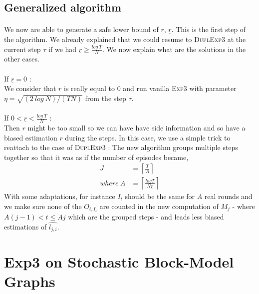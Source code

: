 \documentclass[11pt,a4paper]{article}
\begin{document}
\subsection{Generalized algorithm}
\paragraph{}We now are able to generate a safe lower bound of $r$, $\underline{r}$. This is the first step of the algorithm. We already explained that we could resume to \textsc{DuplExp3} at the current step $\tau$ if we had $ \underline{r} \geq \frac{log\ T}{N}$. We now explain what are the solutions in the other cases.\\

\paragraph{} If $\underline{r}=0$ : \\
We consider that $r$ is really equal to $0$ and run vanilla \textsc{Exp3} with parameter $\eta=\sqrt{\left(2\ log\ N \right)/\left(TN\right)}$ from the step $\tau$.

\paragraph{}If $0< \underline{r} < \frac{log\ T}{N}$ :\\
Then $r$ might be too small so we can have have side information and so have a biased estimation $r$ during the steps. In this case, we use a simple trick to reattach to the case of \textsc{DuplExp3} : The new algorithm groups multiple steps together so that it was as if the number of episodes became,
\begin{align*}
J &= \left\lceil \frac{T}{A} \right\rceil \\
where\ A & =\left\lceil \frac{log T}{N \underline{r}} \right\rceil
\end{align*}
With some adaptations, for instance $I_t$ should be the same for $A$ real rounds and we make sure none of the $O_{t,I_t}$ are counted in the new computation of $M_j$ - where $A(j-1)<t\leq Aj$ which are the grouped steps - and leads less biased estimations of $\hat{l_{j,i}}$.

\section{Exp3 on Stochastic Block-Model Graphs}
\end{document}
